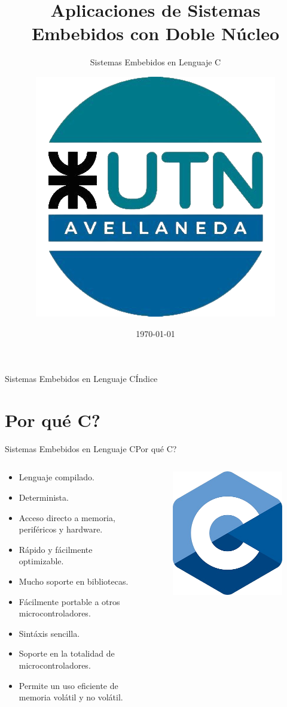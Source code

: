 \documentclass[aspectratio=169, xcolor=dvipsnames]{beamer}
\title{Aplicaciones de Sistemas Embebidos con Doble Núcleo}
\subtitle{Sistemas Embebidos en Lenguaje C}
\author[Fabrizio Carlassara - Laboratorio de Sistemas Embebidos]{\includegraphics[scale=0.15]{resources/images/utn_logo.png}}
\institute{UTN FRA\\Departamento de Ingeniería Electrónica\\Laboratorio de Sistemas Embebidos}
\date[]{\today}
\begin{document}
\frame{\titlepage}
\begin{frame}{Sistemas Embebidos en Lenguaje C}{Índice}
\begin{multicols}{3}
\tableofcontents
\end{multicols}
\end{frame}

\section{Por qué C?}
\begin{frame}{Sistemas Embebidos en Lenguaje C}{Por qué C?}
\begin{columns}
    \begin{column}{0.75\textwidth}
    \begin{itemize}
        \item Lenguaje compilado.
        \item Determinista.
        \item Acceso directo a memoria, periféricos y hardware.
        \item Rápido y fácilmente optimizable.
        \item Mucho soporte en bibliotecas.
        \item Fácilmente portable a otros microcontroladores.
        \item Sintáxis sencilla.
        \item Soporte en la totalidad de microcontroladores.
        \item Permite un uso eficiente de memoria volátil y no volátil.
    \end{itemize}
    \end{column}
    \begin{column}{0.25\textwidth}
        \begin{figure}
            \centering
            \includegraphics[width=0.5\linewidth]{resources/images/c_logo.png}
        \end{figure}
    \end{column}
\end{columns}
\end{frame}
\end{document}
